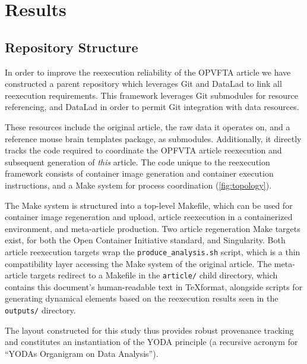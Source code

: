 \section{Results}


\subsection{Repository Structure}

In order to improve the reexecution reliability of the OPVFTA article we have constructed a parent repository which leverages Git and DataLad to link all reexecution requirements.
This framework leverages Git submodules for resource referencing, and DataLad \cite{datalad} in order to permit Git integration with data resources.

These resources include the original article, the raw data it operates on, and a reference mouse brain templates package, as submodules.
Additionally, it directly tracks the code required to coordinate the OPFVTA article reexecution and subsequent generation of \emph{this} article.
The code unique to the reexecution framework consists of container image generation and container execution instructions, and a Make system for process coordination (\cref{fig:topology}).

The Make system is structured into a top-level Makefile, which can be used for container image regeneration and upload, article reexecution in a containerized environment, and meta-article production.
Two article regeneration Make targets exist, for both the Open Container Initiative standard, and Singularity.
Both article reexecution targets wrap the \texttt{produce\_analysis.sh} script, which is a thin compatibility layer accessing the Make system of the original article.
The meta-article targets redirect to a Makefile in the \texttt{article/} child directory, which contains this document's human-readable text in \TeX format, alongside scripts for generating dynamical elements based on the reexecution results seen in the \texttt{outputs/} directory.

The layout constructed for this study thus provides robust provenance tracking and constitutes an instantiation of the YODA principle (a recursive acronym for “YODAs Organigram on Data Analysis”\cite{yoda}).

